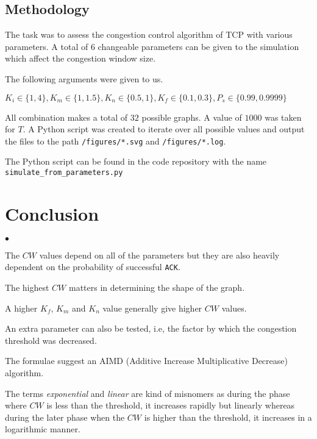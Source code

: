 \documentclass[12pt]{article}
\begin{document}
\subsection*{Methodology}

The task was to assess the congestion control algorithm of TCP with various parameters. A total of $6$ changeable parameters can be given to the simulation which affect the congestion window size.

\noindent
The following arguments were given to us.

\vspace*{8pt}

\noindent
$K_i \in \{1, 4\}, K_m \in \{1, 1.5\}, K_n \in \{0.5, 1\}, K_f \in \{0.1, 0.3\}, P_s \in \{0.99, 0.9999\}$
\vspace*{8pt}

\noindent
All combination makes a total of $32$ possible graphs. A value of $1000$ was taken for $T$. A Python script was created to iterate over all possible values and output the files to the path \texttt{/figures/*.svg} and \texttt{/figures/*.log}.

\vspace*{8pt}
\noindent
The Python script can be found in the code repository with the name \\ \texttt{simulate\_from\_parameters.py}

\newpage

\setcounter{page}{24}

\section*{Conclusion}

\begin{list}{$\bullet$}{}
    \item The $CW$ values depend on all of the parameters but they are also heavily dependent on the probability of successful \texttt{ACK}.
    \item The highest $CW$ matters in determining the shape of the graph.
    \item A higher $K_f$, $K_m$ and $K_n$ value generally give higher $CW$ values.
    \item An extra parameter can also be tested, i.e, the factor by which the congestion threshold was decreased.
    \item The formulae suggest an AIMD (Additive Increase Multiplicative Decrease) algorithm.
    \item The terms \emph{exponential} and \emph{linear} are kind of misnomers as during the phase where $CW$ is less than the threshold, it increases rapidly but linearly whereas during the later phase when the $CW$ is higher than the threshold, it increases in a logarithmic manner.
\end{list}
\end{document}
